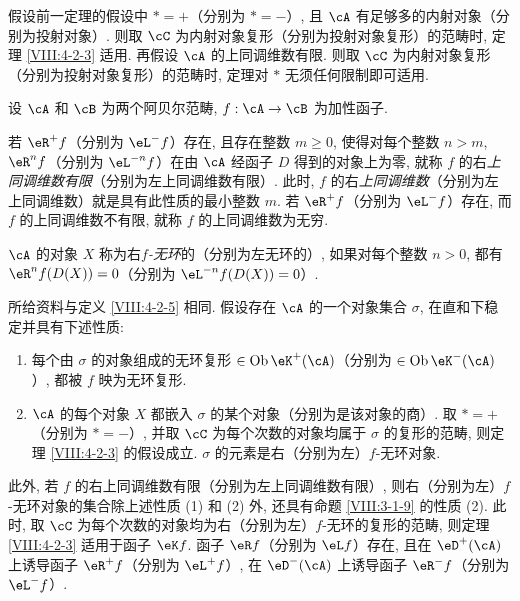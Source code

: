 \begingroup
\renewcommand{\thesubsubsection}{\arabic{subsubsection}}
\makeatletter
\def\p@subsubsection{II.\S2.2-2，推论}
\makeatother
\setcounter{subsubsection}{0}
\def\sgaviiianchorsuffix{corollary1}
\begin{corollary}\label{VIII:4-2-3-1}
假设前一定理的假设中 $\ast=+$（分别为 $\ast=-$）, 且 $\cA$ 有足够多的内射对象（分别为投射对象）. 则取 $\cC$ 为内射对象复形（分别为投射对象复形）的范畴时, 定理 \ref{VIII:4-2-3} 适用. 再假设 $\cA$ 的上同调维数有限. 则取 $\cC$ 为内射对象复形（分别为投射对象复形）的范畴时, 定理对 $\ast$ 无须任何限制即可适用.
\end{corollary}
\endgroup
\def\sgaviiianchorsuffix{base}
\setcounter{subsubsection}{2}
\begin{definition}\label{VIII:4-2-5}
设 $\cA$ 和 $\cB$ 为两个阿贝尔范畴, $f:\cA\to \cB$ 为加性函子.

若 $\eR^+ f$（分别为 $\eL^- f$）存在, 且存在整数 $m\geqslant 0$, 使得对每个整数 $n>m$, $\eR^n f$（分别为 $\eL^{-n} f$）在由 $\cA$ 经函子 $D$ 得到的对象上为零, 就称 $f$ 的右\emph{上同调维数有限}（分别为左上同调维数有限）. 此时, $f$ 的右\emph{上同调维数}（分别为左上同调维数）就是具有此性质的最小整数 $m$. 若 $\eR^+ f$（分别为 $\eL^- f$）存在, 而 $f$ 的上同调维数不有限, 就称 $f$ 的上同调维数为无穷.

$\cA$ 的对象 $X$ 称为右\emph{$f$-无环}的（分别为左无环的）, 如果对每个整数 $n>0$, 都有 $\eR^n f(D(X)) = 0$（分别为 $\eL^{-n} f(D(X))=0$）.
\end{definition}

\begingroup
\renewcommand{\thesubsubsection}{\arabic{subsubsection}}
\makeatletter
\def\p@subsubsection{II.\S2.2-2，推论}
\makeatother
\setcounter{subsubsection}{1}
\def\sgaviiianchorsuffix{corollary2}
\begin{corollary}\label{VIII:4-2-3-2}
所给资料与定义 \ref{VIII:4-2-5} 相同. 假设存在 $\cA$ 的一个对象集合 $\sigma$, 在直和下稳定并具有下述性质:
\begin{enumerate}
  \item 每个由 $\sigma$ 的对象组成的无环复形 $\in \operatorname{Ob}{\eK^+(\cA)}$（分别为 $\in\operatorname{Ob}{\eK^-(\cA)}$）, 都被 $f$ 映为无环复形.
  \item $\cA$ 的每个对象 $X$ 都嵌入 $\sigma$ 的某个对象（分别为是该对象的商）. 取 $\ast=+$（分别为 $\ast=-$）, 并取 $\cC$ 为每个次数的对象均属于 $\sigma$ 的复形的范畴, 则定理 \ref{VIII:4-2-3} 的假设成立. $\sigma$ 的元素是右（分别为左）$f$-无环对象.
\end{enumerate}

此外, 若 $f$ 的右上同调维数有限（分别为左上同调维数有限）, 则右（分别为左）$f$-无环对象的集合除上述性质 (1) 和 (2) 外, 还具有命题 \ref{VIII:3-1-9} 的性质 (2). 此时, 取 $\cC$ 为每个次数的对象均为右（分别为左）$f$-无环的复形的范畴, 则定理 \ref{VIII:4-2-3} 适用于函子 $\eK f$. 函子 $\eR f$（分别为 $\eL f$）存在, 且在 $\eD^+(\cA)$ 上诱导函子 $\eR^+ f$（分别为 $\eL^+ f$）, 在 $\eD^-(\cA)$ 上诱导函子 $\eR^- f$（分别为 $\eL^- f$）.
\end{corollary}
\endgroup
\def\sgaviiianchorsuffix{base}

